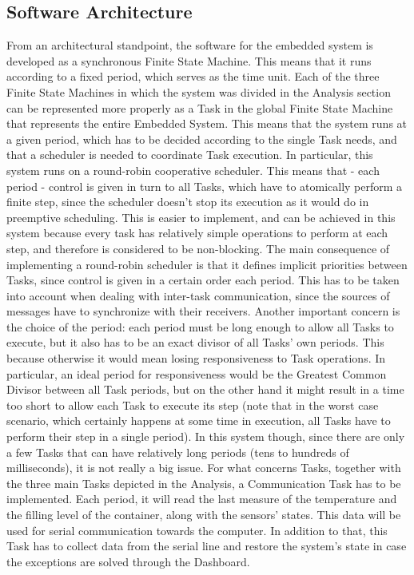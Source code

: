 \documentclass[a4paper,12pt]{report}
\begin{document}
	\subsection{Software Architecture}
	From an architectural standpoint, the software for the embedded system is developed as a synchronous Finite State Machine. This means that it runs according to a fixed period, which serves as the time unit. Each of the three Finite State Machines in which the system was divided in the Analysis section can be represented more properly as a Task in the global Finite State Machine that represents the entire Embedded System. This means that the system runs at a given period, which has to be decided according to the single Task needs, and that a scheduler is needed to coordinate Task execution.
	\newline In particular, this system runs on a round-robin cooperative scheduler. This means that - each period - control is given in turn to all Tasks, which have to atomically perform a finite step, since the scheduler doesn't stop its execution as it would do in preemptive scheduling. This is easier to implement, and can be achieved in this system because every task has relatively simple operations to perform at each step, and therefore is considered to be non-blocking. The main consequence of implementing a round-robin scheduler is that it defines implicit priorities between Tasks, since control is given in a certain order each period. This has to be taken into account when dealing with inter-task communication, since the sources of messages have to synchronize with their receivers. Another important concern is the choice of the period: each period must be long enough to allow all Tasks to execute, but it also has to be an exact divisor of all Tasks' own periods. This because otherwise it would mean losing responsiveness to Task operations. In particular, an ideal period for responsiveness would be the Greatest Common Divisor between all Task periods, but on the other hand it might result in a time too short to allow each Task to execute its step (note that in the worst case scenario, which certainly happens at some time in execution, all Tasks have to perform their step in a single period). In this system though, since there are only a few Tasks that can have relatively long periods (tens to hundreds of milliseconds), it is not really a big issue.
	\newline For what concerns Tasks, together with the three main Tasks depicted in the Analysis, a Communication Task has to be implemented. Each period, it will read the last measure of the temperature and the filling level of the container, along with the sensors' states. This data will be used for serial communication towards the computer. In addition to that, this Task has to collect data from the serial line and restore the system's state in case the exceptions are solved through the Dashboard.
\end{document}
